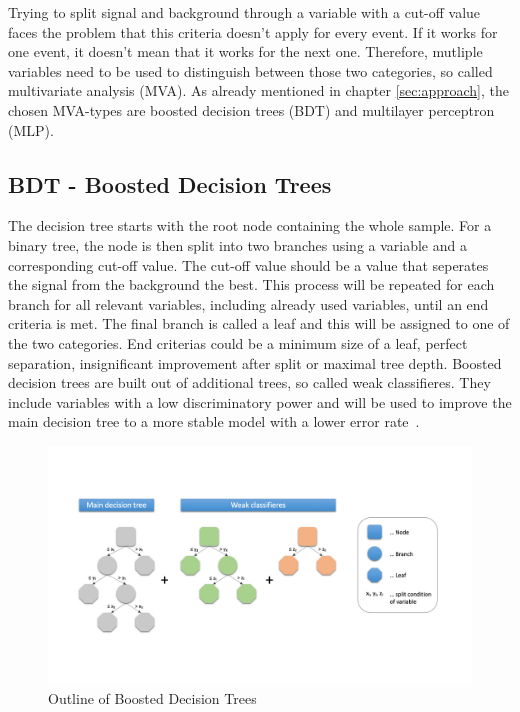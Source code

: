 \documentclass[11pt]{scrartcl}
\begin{document}
Trying to split signal and background through a variable with a cut-off value faces the problem that this criteria doesn't apply for every event. If it works for one event, it doesn't mean that it works for the next one. Therefore, mutliple variables need to be used to distinguish between those two categories, so called multivariate analysis (MVA). As already mentioned in chapter \ref{sec:approach}, the chosen MVA-types are boosted decision trees (BDT) and multilayer perceptron (MLP).

	\subsection{BDT - Boosted Decision Trees}
	The decision tree starts with the root node containing the whole sample. For a binary tree, the node is then split into two branches using a variable and a corresponding cut-off value. The cut-off value should be a value that seperates the signal from the background the best. This process will be repeated for each branch for all relevant variables, including already used variables, until an end criteria is met. The final branch is called a leaf and this will be assigned to one of the two categories. End criterias could be a minimum size of a leaf, perfect separation, insignificant improvement after split or maximal tree depth. Boosted decision trees are built out of additional trees, so called weak classifieres. They include variables with a low discriminatory power and will be used to improve the main decision tree to a more stable model with a lower error rate~\cite{BDT}. 

	\begin{figure}[H]
	\centering
	\includegraphics[width=1\textwidth]{figures/BDT.png}
	\caption{Outline of Boosted Decision Trees}
	\end{figure}
	
\end{document}
